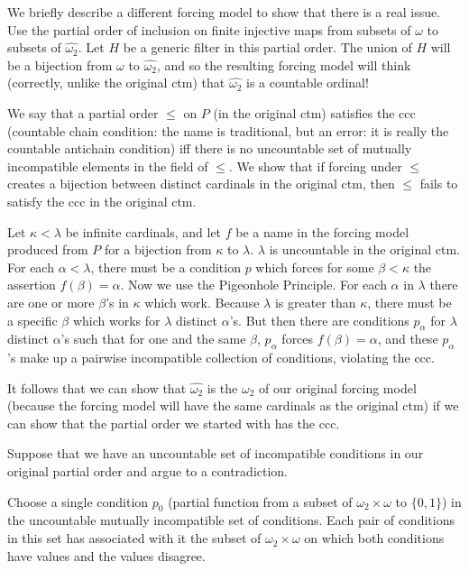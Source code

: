 \documentclass[12pt]{book}
\begin{document}
We briefly describe a different forcing model to show that there is a real issue.  Use the partial order of inclusion on finite injective maps from subsets of
$\omega$ to subsets of $\hat{\omega_2}$.  Let $H$ be a generic filter in this partial order.  The union of $H$ will be a bijection from $\omega$ to $\hat{\omega_2}$, and so the resulting forcing model will think (correctly, unlike the original ctm) that $\hat{\omega_2}$ is a countable ordinal!

We say that a partial order $\leq$ on $P$ (in the original ctm) satisfies the ccc (countable chain condition:  the name is traditional, but an error:  it is really the countable antichain condition) iff there is
no uncountable set of mutually incompatible elements in the field of $\leq$.  We show that if forcing under $\leq$ creates a bijection between distinct cardinals in 
the original ctm, then $\leq$ fails to satisfy the ccc in the original ctm.

Let $\kappa < \lambda$ be infinite  cardinals, and let $f$ be a name in the forcing model produced from $P$ for a bijection from $\kappa$ to $\lambda$.  $\lambda$ is uncountable 
in the original ctm.  For each $\alpha < \lambda$, there must be a condition $p$ which forces for some $\beta<\kappa$ the assertion $f(\beta) = \alpha$.   Now we use the Pigeonhole Principle.  For each $\alpha$ in $\lambda$ there are one or more $\beta$'s in $\kappa$ which work.  Because $\lambda$ is greater than $\kappa$, there must be a specific $\beta$ which works for $\lambda$ distinct $\alpha$'s.   But then there are conditions $p_{\alpha}$ for $\lambda$ distinct $\alpha$'s such that for one and the same $\beta$,
$p_{\alpha}$ forces $f(\beta) = \alpha$, and these $p_{\alpha}$'s make up a pairwise incompatible collection of conditions, violating the ccc.

It follows that we can show that $\hat{\omega_2}$ is the $\omega_2$ of our original forcing model (because the forcing model will have the same cardinals as the original ctm) if we can show that the partial order we started with has the ccc.

Suppose that we have an uncountable set of incompatible conditions in our original partial order and argue to a contradiction.

Choose a single condition $p_0$ (partial function from a subset of $\omega_2 \times \omega$ to $\{0,1\}$) in the uncountable mutually incompatible set of conditions.
Each pair of conditions in this set has associated with it the subset of $\omega_2 \times \omega$ on which both conditions have values and the values disagree.
\end{document}
